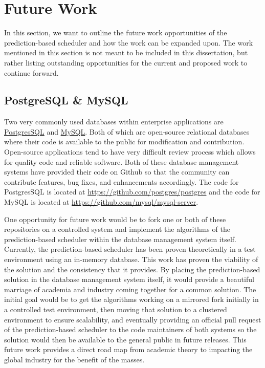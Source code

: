 \section{Future Work}
\label{conclusion:future_work}
In this section, we want to outline the future work opportunities of the prediction-based scheduler and how the work can be expanded upon. The work mentioned in this section is not meant to be included in this dissertation, but rather listing outstanding opportunities for the current and proposed work to continue forward.

\subsection{PostgreSQL \& MySQL}
\label{conclusion:posgressql}
Two very commonly used databases within enterprise applications are \href{https://www.postgresql.org/}{PostgresSQL} and \href{https://www.mysql.com/}{MySQL}. Both of which are open-source relational databases where their code is available to the public for modification and contribution. Open-source applications tend to have very difficult review process which allows for quality code and reliable software. Both of these database management systems have provided their code on Github so that the community can contribute features, bug fixes, and enhancements accordingly. The code for PostgresSQL is located at \href{https://github.com/postgres/postgres}{https://github.com/postgres/postgres} and the code for MySQL is located at \href{https://github.com/mysql/mysql-server}{https://github.com/mysql/mysql-server}.

One opportunity for future work would be to fork one or both of these repositories on a controlled system and implement the algorithms of the prediction-based scheduler within the database management system itself. Currently, the prediction-based scheduler has been proven theoretically in a test environment using an in-memory database. This work has proven the viability of the solution and the consistency that it provides. By placing the prediction-based solution in the database management system itself, it would provide a beautiful marriage of academia and industry coming together for a common solution. The initial goal would be to get the algorithms working on a mirrored fork initially in a controlled test environment, then moving that solution to a clustered environment to ensure scalability, and eventually providing an official pull request of the prediction-based scheduler to the code maintainers of both systems so the solution would then be available to the general public in future releases. This future work provides a direct road map from academic theory to impacting the global industry for the benefit of the masses.